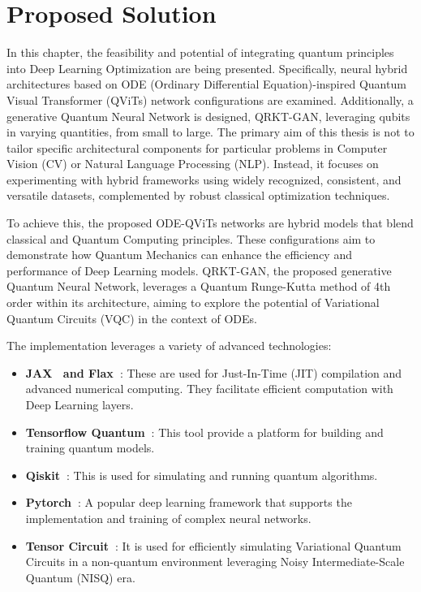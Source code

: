 \documentclass[12pt,a4paper]{report}
\begin{document}
\chapter{Proposed Solution}\vspace{-12pt}\label{solution}

In this chapter, the feasibility and potential of integrating quantum principles into Deep Learning Optimization are being presented. Specifically, neural hybrid architectures based on ODE (Ordinary Differential Equation)-inspired Quantum Visual Transformer (QViTs) network configurations are examined. Additionally, a generative Quantum Neural Network is designed, QRKT-GAN, leveraging qubits in varying quantities, from small to large. The primary aim of this thesis is not to tailor specific architectural components for particular problems in Computer Vision (CV) or Natural Language Processing (NLP). Instead, it focuses on experimenting with hybrid frameworks using widely recognized, consistent, and versatile datasets, complemented by robust classical optimization techniques.

To achieve this, the proposed ODE-QViTs networks are hybrid models that blend classical and Quantum Computing principles. These configurations aim to demonstrate how Quantum Mechanics can enhance the efficiency and performance of Deep Learning models. QRKT-GAN, the proposed generative Quantum Neural Network, leverages a Quantum Runge-Kutta method of 4th order within its architecture, aiming to explore the potential of Variational Quantum Circuits (VQC) in the context of ODEs.

The implementation leverages a variety of advanced technologies:

\begin{itemize}
  \item \textbf{JAX~\cite{bradbury2018jax} and Flax~\cite{heek2020flax}}: These are used for Just-In-Time (JIT) compilation and advanced numerical computing. They facilitate efficient computation with Deep Learning layers.
  \item \textbf{Tensorflow Quantum~\cite{broughton2020tensorflow}}: This tool provide a platform for building and training quantum models.
  \item \textbf{Qiskit~\cite{cross2018ibm}}: This is used for simulating and running quantum algorithms.
  \item \textbf{Pytorch~\cite{imambi2021pytorch}}: A popular deep learning framework that supports the implementation and training of complex neural networks.
  \item \textbf{Tensor Circuit~\cite{Zhang_2023}}: It is used for efficiently simulating Variational Quantum Circuits in a non-quantum environment leveraging Noisy Intermediate-Scale Quantum (NISQ) era.
\end{itemize}
\end{document}
